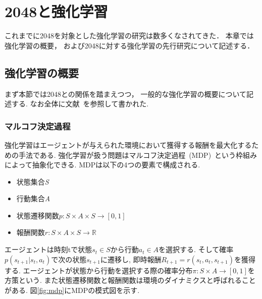 \chapter{2048と強化学習}
\label{chap:rl}
これまでに2048を対象とした強化学習の研究は数多くなされてきた． 
本章では強化学習の概要， および2048に対する強化学習の先行研究について記述する．

\section{強化学習の概要}
\label{sec:rl_general}
まず本節では2048との関係を踏まえつつ， 一般的な強化学習の概要について記述する.
なお全体に文献~\cite{Sutton1998}を参照して書かれた.

\subsection{マルコフ決定過程}
\label{subsec:mdp}
強化学習はエージェントが与えられた環境において獲得する報酬を最大化するための手法である.
強化学習が扱う問題はマルコフ決定過程~(MDP)~という枠組みによって抽象化できる. 
MDPは以下の4つの要素で構成される. 
\begin{itemize}
  \item 状態集合\textit{S}
  \item 行動集合\textit{A}
  \item 状態遷移関数$p:S \times A \times S \rightarrow [0,1]$
  \item 報酬関数$r:S \times A \times S \rightarrow \mathbb{R}$
\end{itemize}
エージェントは時刻tで状態$s_t \in S$から行動$a_t \in A$を選択する.
そして確率$p(s_{t+1}|s_t,a_t)$で次の状態$s_{t+1}$に遷移し, 即時報酬$R_{t+1}=r(s_t,a_t,s_{t+1})$を獲得する.
エージェントが状態から行動を選択する際の確率分布$\pi:S \times A \rightarrow [0,1]$を方策という. 
また状態遷移関数と報酬関数は環境のダイナミクスと呼ばれることがある. 
図\ref{fig:mdp}にMDPの模式図を示す.

